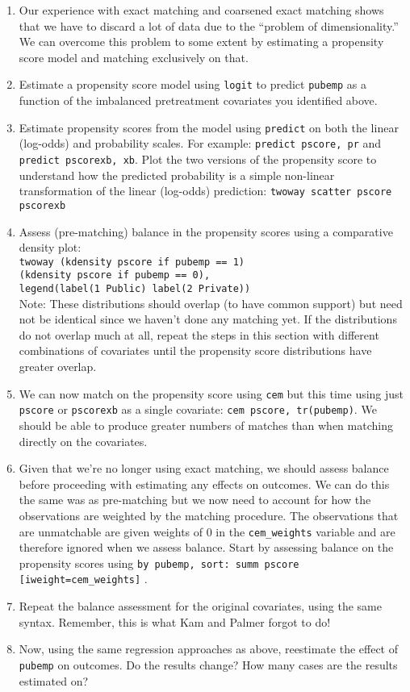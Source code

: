 \documentclass[a4paper,12pt]{article}
\begin{document}
\begin{enumerate}
\item Our experience with exact matching and coarsened exact matching shows that we have to discard a lot of data due to the ``problem of dimensionality.'' We can overcome this problem to some extent by estimating a propensity score model and matching exclusively on that.
\item Estimate a propensity score model using \texttt{logit} to predict \texttt{pubemp} as a function of the imbalanced pretreatment covariates you identified above.
\item Estimate propensity scores from the model using \texttt{predict} on both the linear (log-odds) and probability scales. For example: \texttt{predict pscore, pr} and \texttt{predict pscorexb, xb}.
Plot the two versions of the propensity score to understand how the predicted probability is a simple non-linear transformation of the linear (log-odds) prediction: \texttt{twoway scatter pscore pscorexb}
\item Assess (pre-matching) balance in the propensity scores using a comparative density plot:\\
\texttt{twoway (kdensity pscore if pubemp == 1)\\ (kdensity pscore if pubemp == 0),\\ legend(label(1 Public) label(2 Private))}\\
Note: These distributions should overlap (to have common support) but need not be identical since we haven't done any matching yet. If the distributions do not overlap much at all, repeat the steps in this section with different combinations of covariates until the propensity score distributions have greater overlap.
\item We can now match on the propensity score using \texttt{cem} but this time using just \texttt{pscore} or \texttt{pscorexb} as a single covariate: \texttt{cem pscore, tr(pubemp)}. We should be able to produce greater numbers of matches than when matching directly on the covariates.

\item Given that we're no longer using exact matching, we should assess balance before proceeding with estimating any effects on outcomes. We can do this the same was as pre-matching but we now need to account for how the observations are weighted by the matching procedure. The observations that are unmatchable are given weights of 0 in the \texttt{cem\_weights} variable and are therefore ignored when we assess balance. Start by assessing balance on the propensity scores using \texttt{by pubemp, sort: summ pscore [iweight=cem\_weights]} .
\item Repeat the balance assessment for the original covariates, using the same syntax. Remember, this is what Kam and Palmer forgot to do!
\item Now, using the same regression approaches as above, reestimate the effect of \texttt{pubemp} on outcomes. Do the results change? How many cases are the results estimated on?


\end{enumerate}
\end{document}
